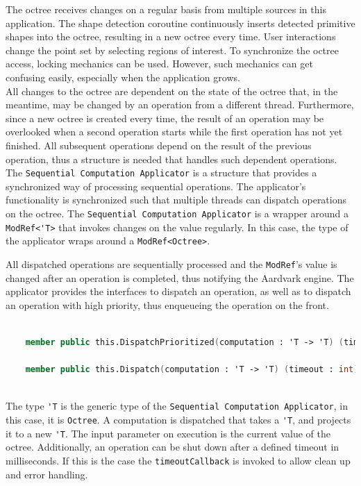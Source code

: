 The octree receives changes on a regular basis from multiple sources in this application. The shape detection coroutine continuously inserts detected primitive shapes into the octree, resulting in a new octree every time. User interactions change the point set by selecting regions of interest. To synchronize the octree access, locking mechanics can be used. However, such mechanics can get confusing easily, especially when the application grows. 
\\
All changes to the octree are dependent on the state of the octree that, in the meantime, may be changed by an operation from a different thread. Furthermore, since a new octree is created every time, the result of an operation may be overlooked when a second operation starts while the first operation has not yet finished. All subsequent operations depend on the result of the previous operation, thus a structure is needed that handles such dependent operations. 
\\
The \verb|Sequential Computation Applicator| is a structure that provides a synchronized way of processing sequential operations. The applicator's functionality is synchronized such that multiple threads can dispatch operations on the octree. The \verb|Sequential Computation Applicator| is a wrapper around a \verb|ModRef<'T>| that invokes changes on the value regularly. 
In this case, the type of the applicator wraps around a \verb|ModRef<Octree>|. 

All dispatched operations are sequentially processed and the \verb|ModRef|'s value is changed after an operation is completed, thus notifying the Aardvark engine. 
The applicator provides the interfaces to dispatch an operation, as well as to dispatch an operation with high priority, thus enqueueing the operation on the front. 

\begin{lstlisting}[language = FSharp]

    member public this.DispatchPrioritized(computation : 'T -> 'T) (timeout : int) (timeoutCallback  : unit -> unit) : unit = ...

    member public this.Dispatch(computation : 'T -> 'T) (timeout : int) (timeoutCallback  : unit -> unit) : unit = ...
   
\end{lstlisting}

The type \verb|'T| is the generic type of the \verb|Sequential Computation Applicator|, in this case, it is \verb|Octree|. A computation is dispatched that takes a \verb|'T|, and projects it to a new \verb|'T|. The input parameter on execution is the current value of the octree. 
Additionally, an operation can be shut down after a defined timeout in milliseconds. If this is the case the \verb|timeoutCallback| is invoked to allow clean up and error handling. 


